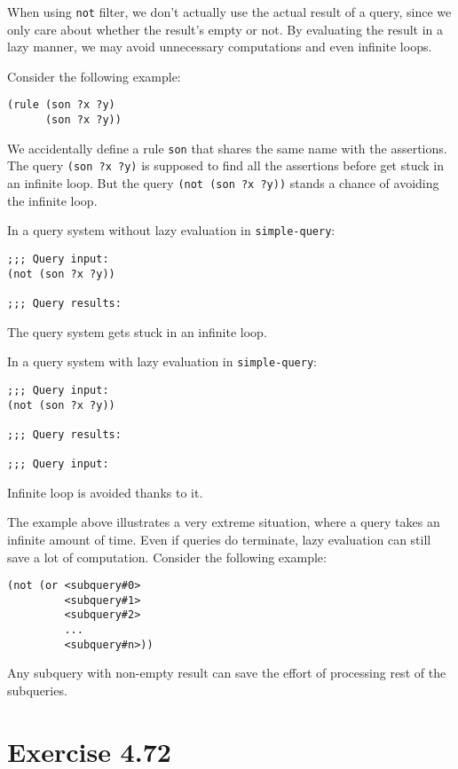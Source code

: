 \documentclass[../main.tex]{subfiles}
\begin{document}
When using \lstinline{not} filter, we don't actually use the actual result of a query, since we only care about whether the result's empty or not. By evaluating the result in a lazy manner, we may avoid unnecessary computations and even infinite loops.

Consider the following example:

\begin{lstlisting}
(rule (son ?x ?y)
      (son ?x ?y))
\end{lstlisting}

We accidentally define a rule \lstinline{son} that shares the same name with the assertions. The query \lstinline{(son ?x ?y)} is supposed to find all the assertions before get stuck in an infinite loop. But the query \lstinline{(not (son ?x ?y))} stands a chance of avoiding the infinite loop.

In a query system without lazy evaluation in \lstinline{simple-query}:

\begin{lstlisting}
;;; Query input:
(not (son ?x ?y))

;;; Query results:
\end{lstlisting}

The query system gets stuck in an infinite loop.

In a query system with lazy evaluation in \lstinline{simple-query}:

\begin{lstlisting}
;;; Query input:
(not (son ?x ?y))

;;; Query results:

;;; Query input:
\end{lstlisting}

Infinite loop is avoided thanks to it.

The example above illustrates a very extreme situation, where a query takes an infinite amount of time. Even if queries do terminate, lazy evaluation can still save a lot of computation. Consider the following example:

\begin{lstlisting}
(not (or <subquery#0>
         <subquery#1>
         <subquery#2>
         ...
         <subquery#n>))
\end{lstlisting}

Any subquery with non-empty result can save the effort of processing rest of the subqueries.

\section{Exercise 4.72}
\end{document}
